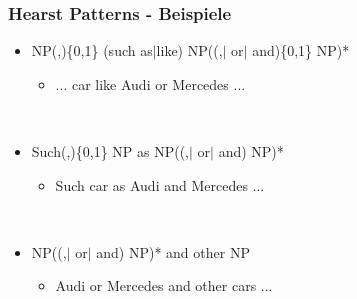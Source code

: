 \begin{frame}
  \frametitle{Hearst Patterns - Beispiele}

  \begin{itemize}
  \item NP(,)\{0,1\} (such as$\vert$like)
    NP((,$\vert$ or$\vert$ and)\{0,1\} NP)*
    \begin{itemize}
    \item ... car like Audi or Mercedes ...
    \end{itemize}~\\

  \item Such(,)\{0,1\} NP as NP((,$\vert$ or$\vert$ and) NP)*
    \begin{itemize}
    \item Such car as Audi and Mercedes ...
    \end{itemize}~\\

  \item NP((,$\vert$ or$\vert$ and) NP)* and  other NP
    \begin{itemize}
    \item Audi or Mercedes and other cars ...
    \end{itemize}

  \end{itemize}
\end{frame}
